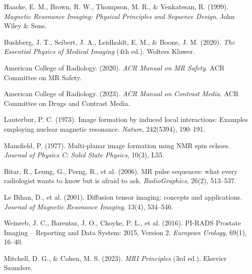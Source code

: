 \documentclass[11pt,a4paper]{article}
\begin{document}
\begin{enumerate}[label={[\arabic*]},leftmargin=*]
    \item Haacke, E. M., Brown, R. W., Thompson, M. R., \& Venkatesan, R. (1999). \textit{Magnetic Resonance Imaging: Physical Principles and Sequence Design}. John Wiley \& Sons.
    \item Bushberg, J. T., Seibert, J. A., Leidholdt, E. M., \& Boone, J. M. (2020). \textit{The Essential Physics of Medical Imaging} (4th ed.). Wolters Kluwer.
    \item American College of Radiology. (2020). \textit{ACR Manual on MR Safety}. ACR Committee on MR Safety.
    \item American College of Radiology. (2023). \textit{ACR Manual on Contrast Media}. ACR Committee on Drugs and Contrast Media.
    \item Lauterbur, P. C. (1973). Image formation by induced local interactions: Examples employing nuclear magnetic resonance. \textit{Nature}, 242(5394), 190--191.
    \item Mansfield, P. (1977). Multi-planar image formation using NMR spin echoes. \textit{Journal of Physics C: Solid State Physics}, 10(3), L55.
    \item Bitar, R., Leung, G., Perng, R., et al. (2006). MR pulse sequences: what every radiologist wants to know but is afraid to ask. \textit{RadioGraphics}, 26(2), 513--537.
    \item Le Bihan, D., et al. (2001). Diffusion tensor imaging: concepts and applications. \textit{Journal of Magnetic Resonance Imaging}, 13(4), 534--546.
    \item Weinreb, J. C., Barentsz, J. O., Choyke, P. L., et al. (2016). PI-RADS Prostate Imaging – Reporting and Data System: 2015, Version 2. \textit{European Urology}, 69(1), 16--40.
    \item Mitchell, D. G., \& Cohen, M. S. (2023). \textit{MRI Principles} (3rd ed.). Elsevier Saunders.
\end{enumerate}
\end{document}
